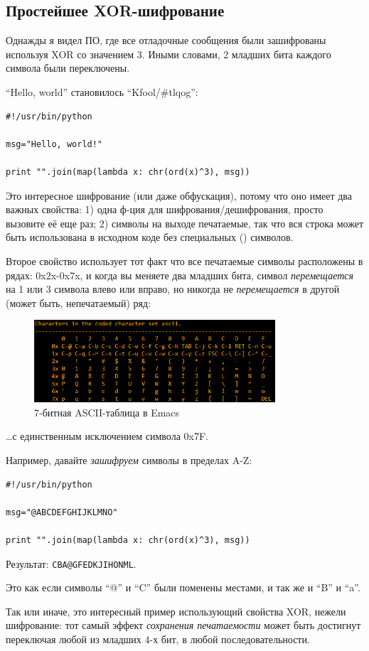 \subsection{Простейшее XOR-шифрование}

Однажды я видел ПО, где все отладочные сообщения были зашифрованы используя XOR со значением 3.
Иными словами, 2 младших бита каждого символа были переключены.

``Hello, world'' становилось ``Kfool/\#tlqog'':

\begin{lstlisting}[caption=Python,style=custompy]
#!/usr/bin/python

msg="Hello, world!"

print "".join(map(lambda x: chr(ord(x)^3), msg))
\end{lstlisting}

Это интересное шифрование (или даже обфускация), потому что оно имеет два важных свойства:
1) одна ф-ция для шифрования/дешифрования, просто вызовите её еще раз;
2) символы на выходе печатаемые, так что вся строка может быть использована в исходном коде без специальных () символов.

Второе свойство использует тот факт что все печатаемые символы расположены в рядах: 0x2x-0x7x, и когда вы меняете
два младших бита, символ \emph{перемещается} на 1 или 3 символа влево или вправо, но никогда не \emph{перемещается} в другой
(может быть, непечатаемый) ряд:

\begin{figure}[H]
\centering
\includegraphics[width=0.8\textwidth]{ascii_clean.png}
\caption{7-битная \ac{ASCII}-таблица в Emacs}
\end{figure}

\dots с единственным исключением символа 0x7F.

Например, давайте \emph{зашифруем} символы в пределах A-Z:

\begin{lstlisting}
#!/usr/bin/python

msg="@ABCDEFGHIJKLMNO"

print "".join(map(lambda x: chr(ord(x)^3), msg))
\end{lstlisting}

Результат: \verb|CBA@GFEDKJIHONML|.

Это как если символы ``@'' и ``C'' были поменены местами, и так же и ``B'' и ``a''.

Так или иначе, это интересный пример использующий свойства XOR, нежели шифрование:
тот самый эффект \emph{сохранения печатаемости} может быть достигнут переключая любой из младших 4-х бит,
в любой последовательности.

